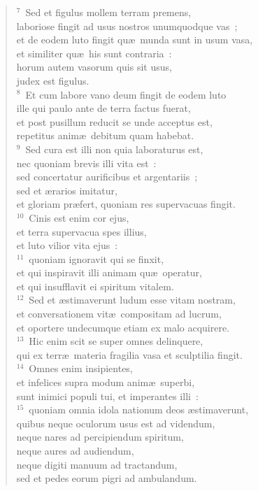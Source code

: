 \begin{verse}${}^{7}$~Sed et figulus mollem terram premens,\\ laboriose fingit ad usus nostros unumquodque vas~;\\ et de eodem luto fingit qu\ae\ munda sunt in usum vasa,\\ et similiter qu\ae\ his sunt contraria~:\\ horum autem vasorum quis sit usus,\\ judex est figulus.\\
${}^{8}$~Et cum labore vano deum fingit de eodem luto\\ ille qui paulo ante de terra factus fuerat,\\ et post pusillum reducit se unde acceptus est,\\ repetitus anim\ae\ debitum quam habebat.\\
${}^{9}$~Sed cura est illi non quia laboraturus est,\\ nec quoniam brevis illi vita est~:\\ sed concertatur aurificibus et argentariis~;\\ sed et \ae rarios imitatur,\\ et gloriam pr\ae fert, quoniam res supervacuas fingit.\\
${}^{10}$~Cinis est enim cor ejus,\\ et terra supervacua spes illius,\\ et luto vilior vita ejus~:\\
${}^{11}$~quoniam ignoravit qui se finxit,\\ et qui inspiravit illi animam qu\ae\ operatur,\\ et qui insufflavit ei spiritum vitalem.\\
${}^{12}$~Sed et \ae stimaverunt ludum esse vitam nostram,\\ et conversationem vit\ae\ compositam ad lucrum,\\ et oportere undecumque etiam ex malo acquirere.\\
${}^{13}$~Hic enim scit se super omnes delinquere,\\ qui ex terr\ae\ materia fragilia vasa et sculptilia fingit.\\
${}^{14}$~Omnes enim insipientes,\\ et infelices supra modum anim\ae\ superbi,\\ sunt inimici populi tui, et imperantes illi~:\\
${}^{15}$~quoniam omnia idola nationum deos \ae stimaverunt,\\ quibus neque oculorum usus est ad videndum,\\ neque nares ad percipiendum spiritum,\\ neque aures ad audiendum,\\ neque digiti manuum ad tractandum,\\ sed et pedes eorum pigri ad ambulandum.\\

\end{verse}
